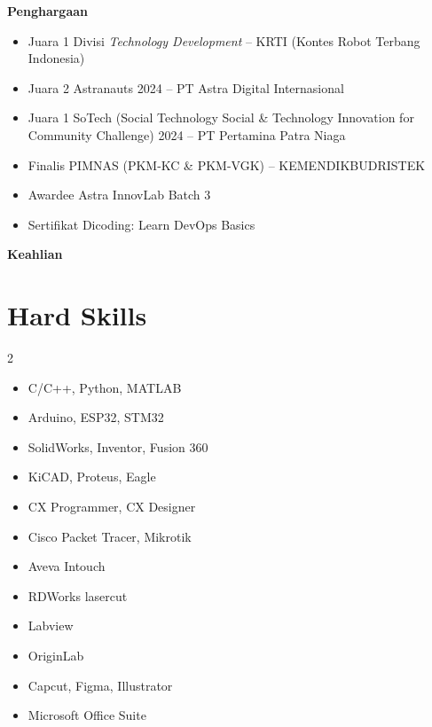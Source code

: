 \documentclass[a4paper,11pt]{article}
\begin{document}
{	%
	\vspace{1em}
	\begin{center}
		{\large\bfseries Penghargaan}\\[-0.6em]
		\noindent\makebox[\linewidth]{\rule{\textwidth}{0.4pt}}
	\end{center}

	\begin{itemize}
		\item Juara 1 Divisi \textit{Technology Development} – KRTI (Kontes Robot Terbang Indonesia)
		\item Juara 2 Astranauts 2024 – PT Astra Digital Internasional
		\item Juara 1 SoTech (Social Technology Social \& Technology Innovation for Community Challenge) 2024 – PT Pertamina Patra Niaga
		\item Finalis PIMNAS (PKM-KC \& PKM-VGK) – KEMENDIKBUDRISTEK
		\item Awardee Astra InnovLab Batch 3
		\item Sertifikat Dicoding: Learn DevOps Basics
	\end{itemize}
	
	\pagebreak
	
	\vspace{1em}
	\begin{center}
		{\large\bfseries Keahlian}\\[-0.6em]
		\noindent\makebox[\linewidth]{\rule{\textwidth}{0.4pt}}
	\end{center}
	
	\section*{Hard Skills}
	\begin{multicols}{2}
		\begin{itemize}
			\item C/C++, Python, MATLAB
			\item Arduino, ESP32, STM32
			\item SolidWorks, Inventor, Fusion 360
			\item KiCAD, Proteus, Eagle
			\item CX Programmer, CX Designer
			\item Cisco Packet Tracer, Mikrotik
			\item Aveva Intouch
			\item RDWorks lasercut
			\item Labview
			\item OriginLab
			\item Capcut, Figma, Illustrator
			\item Microsoft Office Suite
		\end{itemize}
	\end{multicols}
	
}
\end{document}
